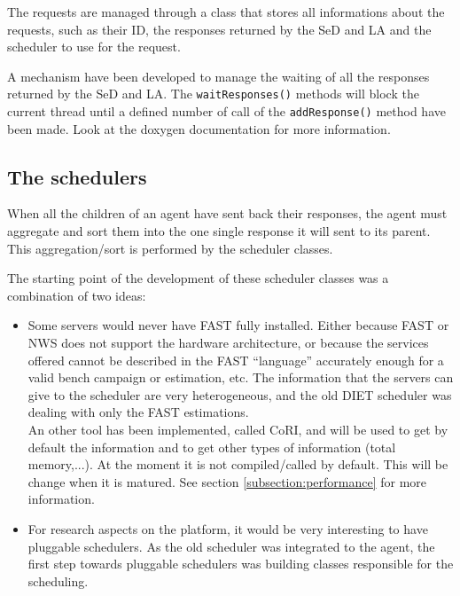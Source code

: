   The requests are managed through a class that stores all informations
  about the requests, such as their ID, the responses returned by the SeD and LA
  and the scheduler to use for the request.

  A mechanism have been developed to manage the waiting of all the responses
  returned by the SeD and LA. The \texttt{waitResponses()} methods will block the
  current thread until a defined number of call of the \texttt{addResponse()}
  method have been made. Look at the doxygen documentation for more information.


  \subsection{The schedulers}

  When all the children of an agent have sent back their responses, the agent must
  aggregate and sort them into the one single response it will sent to its parent.
  This aggregation/sort is performed by the scheduler classes.

  The starting point of the development of these scheduler classes was a
  combination of two ideas:
  \begin{itemize}
  \item Some servers would never have FAST fully installed. Either because FAST or
  NWS does not support the hardware architecture, or because the services
  offered cannot be described in the FAST ``language'' accurately enough for a
  valid bench campaign or estimation, etc. The information that the servers can
  give to the scheduler are very heterogeneous, and the old DIET scheduler was
  dealing with only the FAST estimations.\\
  An other tool has been implemented, called CoRI, and will be used to get by 
  default the information and to get other types of information (total memory,...).
  At the moment it is not compiled/called by default. This will be change when
  it is matured. See section \ref{subsection:performance} for more information.
  \item For research aspects on the platform, it would be very interesting to
  have pluggable schedulers. As the old scheduler was integrated to the agent,
  the first step towards pluggable schedulers was building classes responsible
  for the scheduling.\\
  \end{itemize}

